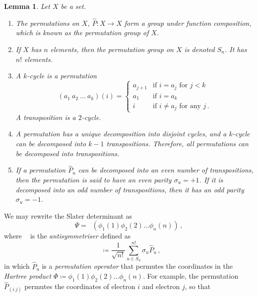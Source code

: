 \documentclass{article}
\theoremstyle{plain}\theoremheaderfont{\normalfont\itshape}\theorembodyfont{\rmfamily}\theoremseparator{.}\newtheorem*{rem}{Remark}\newtheorem*{ex}{Example}\newtheorem*{proof}{Proof}\newtheorem*{altp}{Alternative proof}
\theoremstyle{plain}\theoremheaderfont{\normalfont\bfseries}\theorembodyfont{\rmfamily}\theoremseparator{.}\newtheorem{thm}{Theorem}[section]\newtheorem{lem}[thm]{Lemma}\newtheorem{prop}[thm]{Proposition}\newtheorem*{cor}{Corollary}\newtheorem{defn}[thm]{Definition}\newtheorem{clm}[thm]{Claim}\newtheorem{clminproof}{Claim}
\theoremstyle{break}\theoremheaderfont{\normalfont\itshape}\theorembodyfont{\rmfamily}\theoremseparator{.\medskip}\newtheorem*{proofskip}{Proof}\newtheorem*{exs}{Examples}\newtheorem*{rems}{Remarks}
\theoremstyle{break}\theoremheaderfont{\normalfont\bfseries}\theorembodyfont{\rmfamily}\theoremseparator{.\medskip}\newtheorem{lemskip}[thm]{Lemma}\newtheorem{defnskip}[thm]{Definition}\newtheorem{propskip}[thm]{Proposition}\newtheorem{thmskip}[thm]{Theorem}
\numberwithin{equation}{section}
\DeclareMathOperator{\antisymm}{\hat{\mathcal{A}}}
\begin{document}
    \begin{lem}
        Let \(X\) be a set.
        \begin{enumerate}[topsep=0pt,label=(\roman*)]
            \item The \textit{permutations} on \(X\), \(\hat{P}:X\to X\) form a group under function composition, which is known as the \textit{permutation group of \(X\)}.
            \item If \(X\) has \(n\) elements, then the permutation group on \(X\) is denoted \(S_n\). It has \(n!\) elements.
            \item A \textit{\(k\)-cycle} is a permutation
            \begin{equation}
                (a_1~a_2~\dots ~a_k)(i)=\begin{cases}
                    a_{j+1} & \text{if }i=a_j\text{ for }j<k\\
                    a_1 & \text{if }i=a_k\\
                    i & \text{if }i\ne a_j \text{ for any } j\,.
                \end{cases}
            \end{equation}
            A \textit{transposition} is a \(2\)-cycle.
            \item A permutation has a unique decomposition into disjoint cycles, and a \(k\)-cycle can be decomposed into \(k-1\) transpositions. Therefore, all permutations can be decomposed into transpositions.
            \item If a permutation \(\hat{P}_u\) can be decomposed into an even number of transpositions, then the permutation is said to have an even \textit{parity} \(\sigma_u=+1\). If it is decomposed into an odd number of transpositions, then it has an odd parity \(\sigma_u = -1\).
        \end{enumerate}
    \end{lem}
    We may rewrite the Slater determinant as
    \begin{equation}
        \Psi=\antisymm(\phi_1(1)\phi_2(2)\dots\phi_n(n))\,,
    \end{equation}
    where \(\antisymm\) is the \textit{antisymmetriser} defined as
    \begin{equation}
        \antisymm\coloneqq\frac{1}{\sqrt{n!}}\sum_{u\in S_n}^{n!}\sigma_u\hat{P}_u\,,
    \end{equation}
    in which \(\hat{P}_u\) is a \textit{permutation operator} that permutes the coordinates in the \textit{Hartree product} \(\Phi\coloneqq\phi_1(1)\phi_2(2)\dots\phi_n(n)\). For example, the permutation \(\hat{P}_{(i\ j)}\) permutes the coordinates of electron \(i\) and electron \(j\), so that
\end{document}

